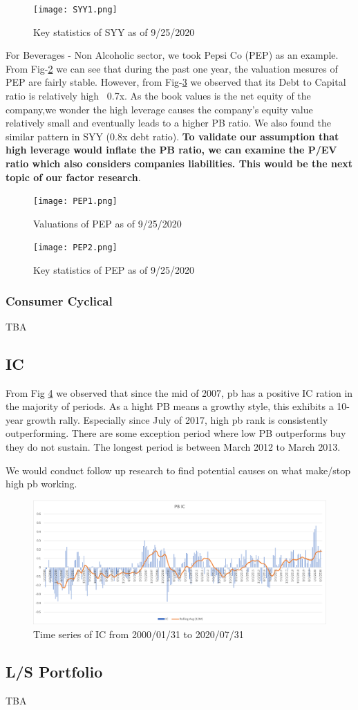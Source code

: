 \documentclass[11pt]{article} %
\begin{document}
\begin{figure}[H]
\centering
\texttt{[image: SYY1.png]}
\caption{Key statistics of SYY as of 9/25/2020}
\label{fig:syy1}
\end{figure}

For Beverages - Non Alcoholic sector, we took Pepsi Co (PEP) as an example. From Fig-\ref{fig:pep1} we can see that during the past one year, the valuation mesures of PEP are fairly stable. However, from Fig-\ref{fig:pep2} we observed that its Debt to Capital ratio is relatively high ~0.7x. As the book values is the net equity of the company,we wonder the high leverage causes the company's equity value relatively small and eventually leads to a higher PB ratio. We also found the similar pattern in SYY (0.8x debt ratio). \textbf{To validate our assumption that high leverage would inflate the PB ratio, we can examine the P/EV ratio which also considers companies liabilities. This would be the next topic of our factor research}.

\begin{figure}[H]
\centering
\texttt{[image: PEP1.png]}
\caption{Valuations of PEP as of 9/25/2020}
\label{fig:pep1}
\end{figure}

\begin{figure}[H]
\centering
\texttt{[image: PEP2.png]}
\caption{Key statistics of PEP as of 9/25/2020}
\label{fig:pep2}
\end{figure}


\subsubsection{Consumer Cyclical}
TBA

\subsection{IC}
From Fig \ref{fig:pb_ic_top} we observed that since the mid of 2007, pb has a positive IC ration in the majority of periods. As a hight PB means a growthy style, this exhibits a 10-year growth rally. Especially since July of 2017, high pb rank is consistently outperforming. There are some exception period where low PB outperforms buy they do not sustain. The longest period is between March 2012 to March 2013. 

We would conduct follow up research to find potential causes on what make/stop high pb working.

\begin{figure}[H]
	\centering
	\includegraphics[scale=0.5]{pb_ic_top.png}
	\caption{Time series of IC from 2000/01/31 to 2020/07/31}
	\label{fig:pb_ic_top}
\end{figure}



\subsection{L/S Portfolio}
TBA
\end{document}
